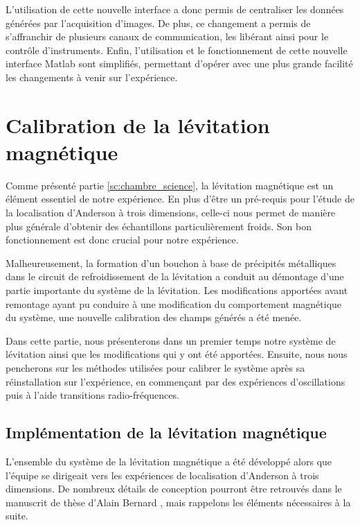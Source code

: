 L'utilisation de cette nouvelle interface a donc permis de centraliser les données générées par l'acquisition d'images.%
De plus, ce changement a permis de s'affranchir de plusieurs canaux de communication, les libérant ainsi pour le contrôle d'instruments. Enfin, l'utilisation et le fonctionnement de cette nouvelle interface Matlab sont simplifiés, permettant d'opérer avec une plus grande facilité les changements à venir sur l'expérience.











\section{Calibration de la lévitation magnétique}
\label{sc:levitation}
Comme présenté partie \ref{sc:chambre_science}, la lévitation magnétique est un élément essentiel de notre expérience. En plus d'être un pré-requis pour l'étude de la localisation d'Anderson à trois dimensions, celle-ci nous permet de manière plus générale d'obtenir des échantillons particulièrement froids. Son bon fonctionnement est donc crucial pour notre expérience.

Malheureusement, la formation d'un bouchon à base de précipités métalliques dans le circuit de refroidissement de la lévitation a conduit au démontage d'une partie importante du système de la lévitation. Les modifications apportées avant remontage ayant pu conduire à une modification du comportement magnétique du système, une nouvelle calibration des champs générés a été menée.

Dans cette partie, nous présenterons dans un premier temps notre système de lévitation ainsi que les modifications qui y ont été apportées. Ensuite, nous nous pencherons sur les méthodes utilisées pour calibrer le système après sa réinstallation sur l'expérience, en commençant par des expériences d'oscillations puis à l'aide transitions radio-fréquences.




\subsection{Implémentation de la lévitation magnétique}
\label{sc:implementation_levitation}
L'ensemble du système de la lévitation magnétique a été développé alors que l'équipe se dirigeait vers les expériences de localisation d'Anderson à trois dimensions. De nombreux détails de conception pourront être retrouvés dans le manuscrit de thèse d'Alain Bernard \citep{bernard2010transport}, mais rappelons les éléments nécessaires à la suite.

